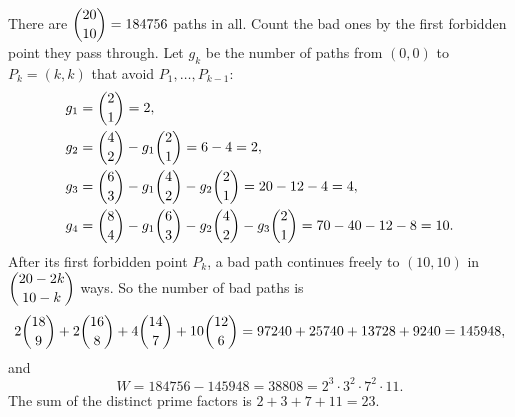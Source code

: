 There are $\dbinom{20}{10}=184756$ paths in all. Count the bad ones by the first forbidden point they pass through. Let $g_k$ be the number of paths from $(0,0)$ to $P_k=(k,k)$ that avoid $P_1,\dots,P_{k-1}$:
\[
\begin{aligned}
g_1&=\dbinom21=2,\\
g_2&=\dbinom42-g_1\dbinom21=6-4=2,\\
g_3&=\dbinom63-g_1\dbinom42-g_2\dbinom21=20-12-4=4,\\
g_4&=\dbinom84-g_1\dbinom63-g_2\dbinom42-g_3\dbinom21=70-40-12-8=10 .
\end{aligned}
\]
After its first forbidden point $P_k$, a bad path continues freely to $(10,10)$ in $\dbinom{20-2k}{10-k}$ ways. So the number of bad paths is
\[
2\dbinom{18}{9}+2\dbinom{16}{8}+4\dbinom{14}{7}+10\dbinom{12}{6}=97240+25740+13728+9240=145948,
\]
and
\[
W=184756-145948=38808=2^3\cdot3^2\cdot7^2\cdot11 .
\]
The sum of the distinct prime factors is $2+3+7+11=\boxed{23}$.
